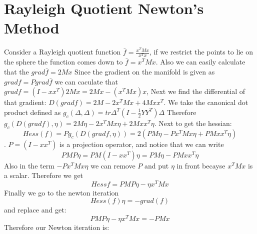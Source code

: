 \documentclass[11pt,a4paper]{report}
\begin{document}
\chapter{Rayleigh Quotient Newton's Method}
Consider a Rayleigh quotient function $\bar{f} = \frac{x^T M x}{x^T x}$, if we restrict the points to lie on the sphere
the function comes down to $\bar{f} = x^T M x $. Also we can easily calculate that the $grad \bar{f} = 2 M x$
Since the gradient on the manifold is given as $grad f = P grad \bar{f}$ we can caculate that
$grad f = (I - x x^T) 2 M x = 2 Mx - (x^T M x) x$, Next we find the differential of that gradient:
$ D(grad f) = 2M - 2x^T M x + 4 M x x^T$. We take the canonical dot product defined as
$g_c( \Delta, \Delta ) = tr \Delta^T (I - \frac{1}{2} Y Y^T) \Delta  $ Therefore
$g_c(D(grad f), \eta) = 2 M \eta - 2 x^T M x \eta + 2 M x x^T \eta$. Next to get the hessian:
$$ Hess(f) = P g_c(D(grad f, \eta)) = 2 ( PM \eta -  P x^T M x \eta +  P M x x^T \eta) $$.
$P = (I - x x^T)$ is a projection operator, and notice that we can write 
$$ PMP \eta =  PM (I - x x^T)  \eta = PM \eta - PM x x^T \eta  $$
Also in the term $ - P x^T M x \eta $ we can remove $P$ and put $\eta$ in front becayse $x^T M x$ is a scalar. Therefore we get
$$ Hess f = P M P \eta - \eta x^T M x $$
Finally we go to the newton iteration
$$ Hess(f) \eta = - grad (f) $$
and replace and get:
\begin{equation} \label{RayleighIt}
 P M P \eta - \eta x^T M x = - P M x 
\end{equation}
Therefore our Newton iteration is:
\begin{enumerate}
    \item Solve \ref*{RayleighIt}}
    \item Set x_{new} = R_(x_k)(\eta_k)
\end{enumerate}

\setcounter{tocdepth}{1} 

 
\end{document}
